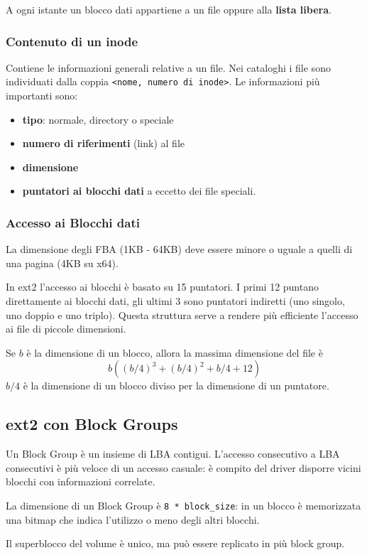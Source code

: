 \documentclass[12pt, a4paper]{report}
\begin{document}
A ogni istante un blocco dati appartiene a un file oppure alla \textbf{lista
libera}.

\subsubsection{Contenuto di un inode}
Contiene le informazioni generali relative a un file. Nei cataloghi i file sono
individuati dalla coppia \texttt{<nome, numero di inode>}. Le informazioni più
importanti sono:
\begin{itemize}
	\item \textbf{tipo}: normale, directory o speciale
	\item \textbf{numero di riferimenti} (link) al file
	\item \textbf{dimensione}
	\item \textbf{puntatori ai blocchi dati} a eccetto dei file speciali.
\end{itemize}

\subsubsection{Accesso ai Blocchi dati}
La dimensione degli FBA (1KB - 64KB) deve essere minore o uguale a quelli di una
pagina (4KB su x64).

In ext2 l'accesso ai blocchi è basato su 15 puntatori. I primi 12 puntano
direttamente ai blocchi dati, gli ultimi 3 sono puntatori indiretti (uno
singolo, uno doppio e uno triplo). Questa struttura serve a rendere più
efficiente l'accesso ai file di piccole dimensioni.

Se $b$ è la dimensione di un blocco, allora la massima dimensione del file è
\[
	b((b/4)^3 + (b/4)^2 + b/4 + 12)
\]
$b/4$ è la dimensione di un blocco diviso per la dimensione di un puntatore.

\subsection{ext2 con Block Groups}
Un Block Group è un insieme di LBA contigui. L'accesso consecutivo a LBA
consecutivi è più veloce di un accesso casuale: è compito del driver disporre
vicini blocchi con informazioni correlate.

La dimensione di un Block Group è \texttt{8 * block\_size}: in un blocco è
memorizzata una bitmap che indica l'utilizzo o meno degli altri blocchi.

Il superblocco del volume è unico, ma può essere replicato in più block
group.
\end{document}
